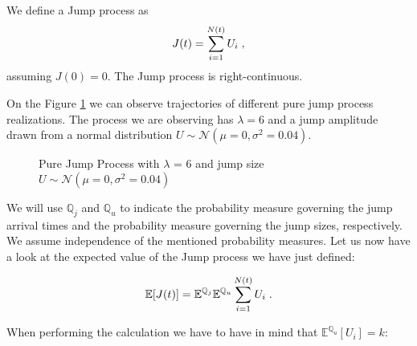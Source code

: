 \documentclass[times, utf8, diplomski]{fer}
\begin{document}
		\begin{definition}
			We define a Jump process as 
			\begin{equation}
				J(t) = \sum_{i=1}^{N(t)} U_i \hspace{0.1cm},
			\end{equation}
			assuming $J(0) = 0$. The Jump process is right-continuous.
		\end{definition}

		\noindent On the Figure \ref{fig:pure_jump_process} we can observe trajectories of different pure jump process realizations. The process we are observing has $\lambda=6$ and a jump amplitude drawn from a normal distribution $U \sim \mathcal{N}(\mu=0,\sigma^2=0.04)$.

		\begin{figure}
		\centering
		\caption{Pure Jump Process with $\lambda$ = 6 and jump size $U \sim \mathcal{N}(\mu=0,\sigma^2=0.04)$}
		\label{fig:pure_jump_process}
		\end{figure}

		We will use $\mathbb{Q}_j$ and $\mathbb{Q}_u$ to indicate the probability measure governing the jump arrival times and the probability measure governing the jump sizes, respectively. We assume independence of the mentioned probability measures. Let us now have a look at the expected value of the Jump process we have just defined:

		\begin{equation} \label{eqn_e_jump} %
		\mathbb{E}[J(t)] = \mathbb{E}^{\mathbb{Q}_j}\mathbb{E}^{\mathbb{Q}_u} \sum_{i=1}^{N(t)} U_i \hspace{0.1cm}.
		\end{equation}

		\noindent When performing the calculation we have to have in mind that $\mathbb{E}^{\mathbb{Q}_u}[U_i] = k$:
\end{document}
